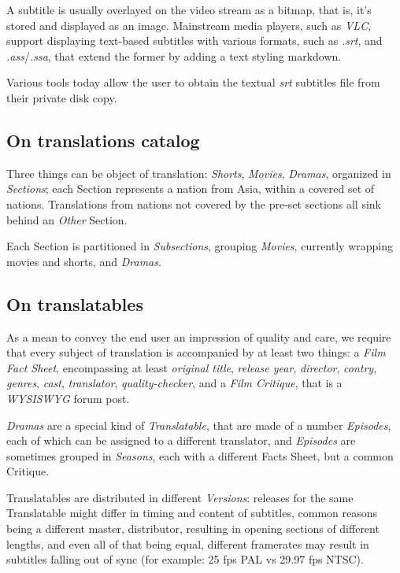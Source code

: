 \documentclass[12pt]{book}
\begin{document}
	A subtitle is usually overlayed on the video stream as a bitmap, that is, it's stored and displayed as an image. Mainstream media players, such as \emph{VLC}, support displaying text-based subtitles with various formats, such as \emph{.srt}, and \emph{.ass}/\emph{.ssa}, that extend the former by adding a text styling markdown. 
	
	Various tools today allow the user to obtain the textual \emph{srt} subtitles file from their private disk copy. 
	
	\subsection{On translations catalog}
	Three things can be object of translation: \emph{Shorts}, \emph{Movies}, \emph{Dramas}, organized in \emph{Sections}; each Section represents a nation from Asia, within a covered set of nations. Translations from nations not covered by the pre-set sections all sink behind an \emph{Other} Section.
	
	Each Section is partitioned in \emph{Subsections}, grouping \emph{Movies}, currently wrapping movies and shorts, and \emph{Dramas}. 
	
	\subsection{On translatables}
	As a mean to convey the end user an impression of quality and care, we require that every subject of translation is accompanied by at least two things: a \emph{Film Fact Sheet}, encompassing at least \emph{original title}, \emph{release year}, \emph{director}, \emph{contry}, \emph{genres}, \emph{cast}, \emph{translator}, \emph{quality-checker}, and a \emph{Film Critique}, that is a \emph{WYSISWYG} forum post.
	
	\emph{Dramas} are a special kind of \emph{Translatable}, that are made of a number \emph{Episodes}, each of which can be assigned to a different translator, and \emph{Episodes} are sometimes grouped in \emph{Seasons}, each with a different Facts Sheet, but a common Critique.
	
	Translatables are distributed in different \emph{Versions}: releases for the same Translatable might differ in timing and content of subtitles, common reasons being a different master, distributor, resulting in opening sections of different lengths, and even all of that being equal, different framerates may result in subtitles falling out of sync (for example: 25 fps PAL  vs 29.97 fps NTSC).
	
\end{document}
